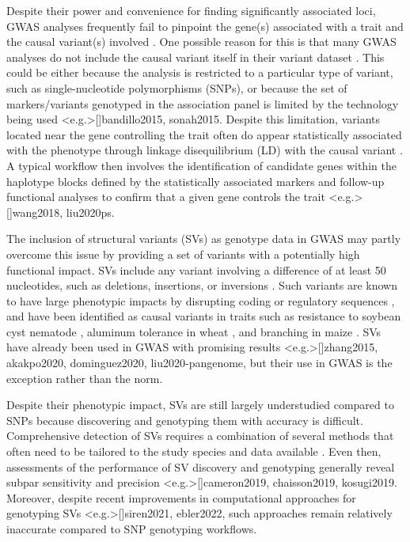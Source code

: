 \documentclass{article}
\begin{document}
Despite their power and convenience for finding significantly associated loci,
GWAS analyses frequently fail to pinpoint the gene(s) associated with a trait and
the causal variant(s) involved . One possible reason for this
is that many GWAS analyses do not include the causal variant itself in their variant dataset
. This could be either because the analysis
is restricted to a particular type of variant, such as single-nucleotide
polymorphisms (SNPs), or because the set of markers/variants genotyped in the
association panel is limited by the technology being used
\shortcite<e.g.>[]{bandillo2015, sonah2015}. Despite this limitation, variants
located near the gene controlling the trait often do appear statistically
associated with the phenotype through linkage disequilibrium (LD) with the
causal variant .  A typical workflow then involves the
identification of candidate genes within the haplotype blocks defined by the
statistically associated markers and follow-up functional analyses to confirm
that a given gene controls the trait \shortcite<e.g.>[]{wang2018, liu2020ps}.

The inclusion of structural variants (SVs) as genotype data in GWAS may partly overcome
this issue by providing a set of variants with a potentially high functional impact.
SVs include any variant involving a difference of at least 50 nucleotides, such as
deletions, insertions, or inversions . Such variants are known to
have large phenotypic impacts by disrupting coding or regulatory sequences
, and have been identified as causal variants in traits such
as resistance to soybean cyst nematode , aluminum tolerance in
wheat , and branching in maize .  SVs have
already been used in GWAS with promising results
\shortcite<e.g.>[]{zhang2015, akakpo2020, dominguez2020, liu2020-pangenome}, but
their use in GWAS is the exception rather than the norm.

Despite their phenotypic impact, SVs are still largely understudied compared to
SNPs because discovering and genotyping them with accuracy is difficult.
Comprehensive detection of SVs requires a combination of several methods that
often need to be tailored to the study species and data available
. Even then, assessments of the performance of SV
discovery and genotyping generally reveal subpar sensitivity and precision
\shortcite<e.g.>[]{cameron2019, chaisson2019, kosugi2019}. Moreover, despite recent
improvements in computational approaches for genotyping SVs
\shortcite<e.g.>[]{siren2021, ebler2022}, such approaches remain relatively
inaccurate compared to SNP genotyping workflows.
\end{document}

